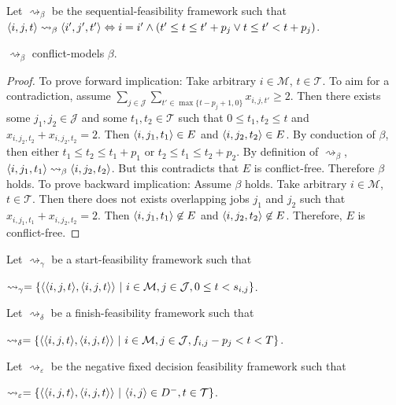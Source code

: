 \begin{definition}
	Let $\rightsquigarrow_\beta$ be the sequential-feasibility framework such that $\langle{i},{j},{t}\rangle\rightsquigarrow_\beta\langle{i'},{j'},{t'}\rangle\Leftrightarrow i=i'\land(t'\leq t\leq t'+p_j\lor t\leq t'<t+p_j)$.
\end{definition}

\begin{lemma}
	\label{conflictfreenessbeta}
	$\rightsquigarrow_\beta$ conflict-models $\beta$.
	
	\begin{proof}
		To prove forward implication: Take arbitrary $i\in\mathcal{M}$, $t\in\mathcal{T}$. To aim for a contradiction, assume $\sum_{j\in\mathcal{J}}\sum_{t'\in\max\{t-p_j+1,0\}}x_{i,j,t'}\geq 2$. Then there exists some $j_1,j_2\in\mathcal{J}$ and some $t_1,t_2\in\mathcal{T}$ such that $0\leq t_1,t_2\leq t$ and $x_{i,j_2,t_2}+x_{i,j_2,t_2}=2$. Then $\langle{i},{j_1},{t_1}\rangle\in E$ and $\langle{i},{j_2},{t_2}\rangle\in E$. By conduction of $\beta$, then either $t_1\leq t_2\leq t_1+p_1$ or $t_2\leq t_1\leq t_2+p_2$. By definition of $\rightsquigarrow_\beta$, $\langle{i},{j_1},{t_1}\rangle\rightsquigarrow_\beta\langle{i},{j_2},{t_2}\rangle$. But this contradicts that $E$ is conflict-free. Therefore $\beta$ holds.
		\linespace
		To prove backward implication: Assume $\beta$ holds. Take arbitrary $i\in\mathcal{M}$, $t\in\mathcal{T}$. Then there does not exists overlapping jobs $j_1$ and $j_2$ such that $x_{i,j_1,t_1}+x_{i,j_2,t_2}=2$. Then $\langle{i},{j_1},{t_1}\rangle\not\in E$ and $\langle{i},{j_2},{t_2}\rangle\not\in E$. Therefore, $E$ is conflict-free.
	\end{proof}
\end{lemma}

\begin{definition}
	Let $\rightsquigarrow_\gamma$ be a start-feasibility framework such that
	
	$\rightsquigarrow_\gamma=\{\pair{\triple{i}{j}{t}}{\triple{i}{j}{t}}\ |\ i\in\mathcal{M},j\in\mathcal{J},0\leq t<s_{i,j}\}$.
\end{definition}

\begin{definition}
	Let $\rightsquigarrow_\delta$ be a finish-feasibility framework such that
	
	$\rightsquigarrow_\delta=\{\pair{\triple{i}{j}{t}}{\triple{i}{j}{t}}\ |\ i\in\mathcal{M},j\in\mathcal{J},f_{i,j}-p_j<t<T\}$.
\end{definition}

\begin{definition}
	Let $\rightsquigarrow_\varepsilon$ be the negative fixed decision feasibility framework such that
	
	$\rightsquigarrow_\varepsilon=\{\pair{\triple{i}{j}{t}}{\triple{i}{j}{t}}\ |\ \pair{i}{j}\in D^-,t\in\mathcal{T}\}$.
\end{definition}

